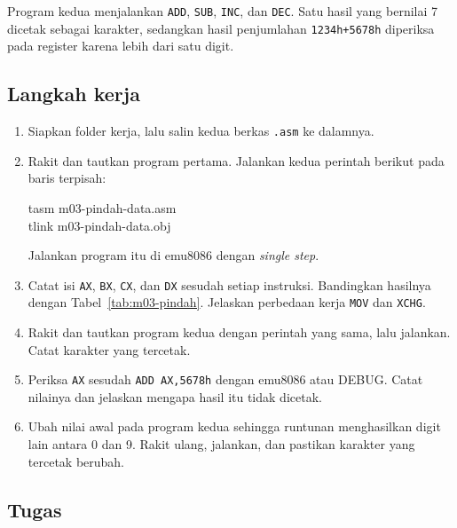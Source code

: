 Program kedua menjalankan \texttt{ADD}, \texttt{SUB}, \texttt{INC},
dan \texttt{DEC}. Satu hasil yang bernilai 7 dicetak sebagai karakter,
sedangkan hasil penjumlahan \texttt{1234h+5678h} diperiksa pada
register karena lebih dari satu digit.



\subsection{Langkah kerja}

\begin{enumerate}
    \item Siapkan folder kerja, lalu salin kedua berkas \texttt{.asm}
          ke dalamnya.
    \item Rakit dan tautkan program pertama. Jalankan kedua perintah
          berikut pada baris terpisah:
          \begin{perintah}
tasm m03-pindah-data.asm\\
tlink m03-pindah-data.obj
\end{perintah}
          Jalankan program itu di emu8086 dengan \emph{single step}.
    \item Catat isi \texttt{AX}, \texttt{BX}, \texttt{CX}, dan
          \texttt{DX} sesudah setiap instruksi. Bandingkan hasilnya
          dengan Tabel~\ref{tab:m03-pindah}. Jelaskan perbedaan kerja
          \texttt{MOV} dan \texttt{XCHG}.
    \item Rakit dan tautkan program kedua dengan perintah yang sama,
          lalu jalankan. Catat karakter yang tercetak.
    \item Periksa \texttt{AX} sesudah \texttt{ADD AX,5678h} dengan
          emu8086 atau DEBUG. Catat nilainya dan jelaskan mengapa
          hasil itu tidak dicetak.
    \item Ubah nilai awal pada program kedua sehingga runtunan
          menghasilkan digit lain antara 0 dan 9. Rakit ulang,
          jalankan, dan pastikan karakter yang tercetak berubah.
\end{enumerate}

\subsection{Tugas}

